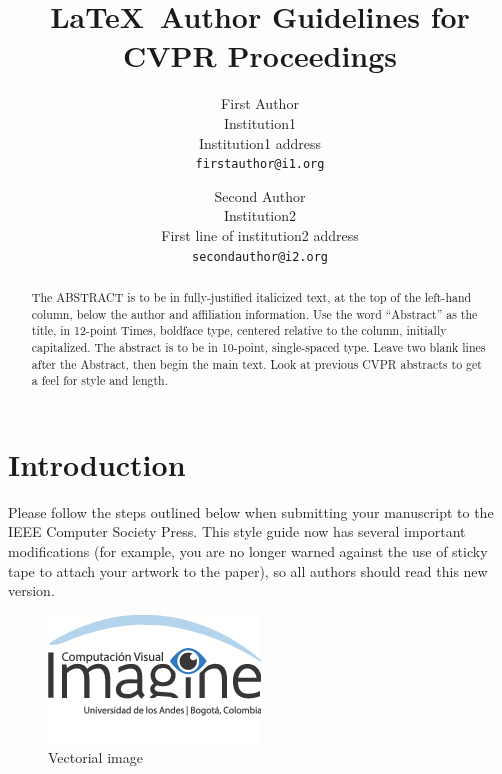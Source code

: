 \documentclass[10pt,twocolumn,letterpaper]{article}
\begin{document}
\title{\LaTeX\ Author Guidelines for CVPR Proceedings}

\author{First Author\\
Institution1\\
Institution1 address\\
{\tt\small firstauthor@i1.org}
\and
Second Author\\
Institution2\\
First line of institution2 address\\
{\tt\small secondauthor@i2.org}
}

\maketitle

\begin{abstract}
   The ABSTRACT is to be in fully-justified italicized text, at the top
   of the left-hand column, below the author and affiliation
   information. Use the word ``Abstract'' as the title, in 12-point
   Times, boldface type, centered relative to the column, initially
   capitalized. The abstract is to be in 10-point, single-spaced type.
   Leave two blank lines after the Abstract, then begin the main text.
   Look at previous CVPR abstracts to get a feel for style and length.
\end{abstract}

\section{Introduction}

Please follow the steps outlined below when submitting your manuscript to
the IEEE Computer Society Press.  This style guide now has several
important modifications (for example, you are no longer warned against the
use of sticky tape to attach your artwork to the paper), so all authors
should read this new version.


\begin{figure}[t]
\begin{center}
   \includegraphics[width=0.8\linewidth]{imagine.png}
\end{center}
   \caption{Vectorial image}
\label{fig:long}
\label{fig:onecol}
\end{figure}
\end{document}
